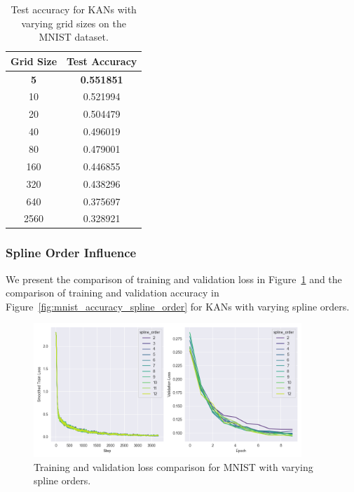 \documentclass{article}
\begin{document}
\begin{table}[H]
    \centering
    \caption{Test accuracy for KANs with varying grid sizes on the MNIST dataset.}
    \label{tab:test_accuracy_grid_size}
    \begin{tabular}{|c|c|}
        \hline
        Grid Size & Test Accuracy \\
        \hline
        \textbf{5}    & \textbf{0.551851} \\
        10   & 0.521994 \\
        20   & 0.504479 \\
        40   & 0.496019 \\
        80   & 0.479001 \\
        160  & 0.446855 \\
        320  & 0.438296 \\
        640  & 0.375697 \\
        2560 & 0.328921 \\
        \hline
    \end{tabular}
\end{table}



\subsubsection{Spline Order Influence}\label{subsubsec:spline-order-influence}

We present the comparison of training and validation loss in Figure~\ref{fig:mnist_loss_spline_order}
and the comparison of training and validation accuracy in Figure~\ref{fig:mnist_accuracy_spline_order} for KANs with varying spline orders.

\begin{figure}[H]
    \centering
    \includegraphics[width=0.9\textwidth]{pics/mnist_loss_spline_order}
    \caption{Training and validation loss comparison for MNIST with varying spline orders.}
    \label{fig:mnist_loss_spline_order}
\end{figure}
\end{document}
